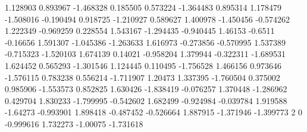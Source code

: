 1.128903 0.893967   
-1.468328 0.185505   
0.573224 -1.364483   
0.895314 1.178479   
-1.508016 -0.190494   
0.918725 -1.210927   
0.589627 1.400978   
-1.450456 -0.574262   
1.222349 -0.969259   
0.228554 1.543167   
-1.294435 -0.940445   
1.46153 -0.6511   
-0.16656 1.591307   
-1.045386 -1.263633   
1.616973 -0.273856   
-0.570995 1.537389   
-0.715323 -1.520103   
1.674139 0.14021   
-0.958204 1.379944   
-0.322311 -1.689531   
1.624452 0.565293   
-1.301546 1.124445   
0.110495 -1.756528   
1.466156 0.973646   
-1.576115 0.783238   
0.556214 -1.711907   
1.20473 1.337395   
-1.760504 0.375002   
0.985906 -1.553573   
0.852825 1.630426   
-1.838419 -0.076257   
1.370448 -1.286962   
0.429704 1.830233   
-1.799995 -0.542602   
1.682499 -0.924984   
-0.039784 1.919588   
-1.64273 -0.993901   
1.898418 -0.487452   
-0.526664 1.887915   
-1.371946 -1.399773   
2 0   
-0.999616 1.732273   
-1.00075 -1.731618   
